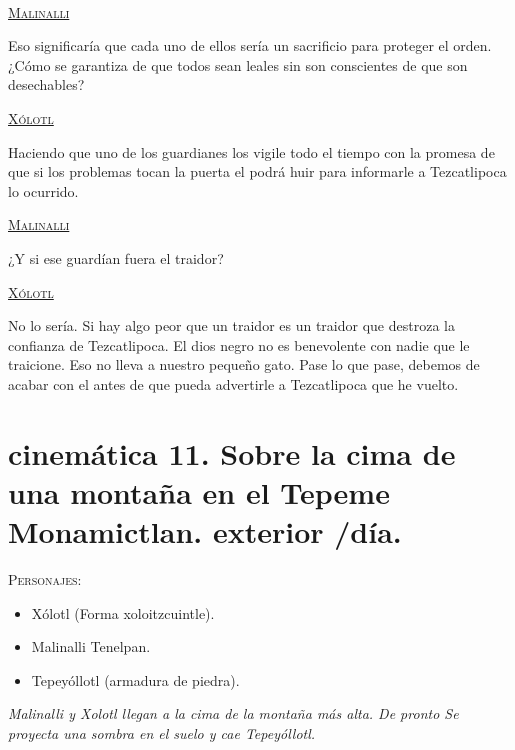 \documentclass[11pt,letterpaper]{article}
\begin{document}
\begin{center}
\\
\par
\textsc{\underline{Malinalli}}
\\
\par
Eso significaría que cada uno de ellos sería un sacrificio para proteger el orden. ¿Cómo se garantiza de que todos sean leales sin son conscientes de que son desechables?
\\
\par
\textsc{\underline{Xólotl}}
\\
\par
Haciendo que uno de los guardianes los vigile todo el tiempo con la promesa de que si los problemas tocan la puerta el podrá huir para informarle a Tezcatlipoca lo ocurrido. 
\\
\par
\textsc{\underline{Malinalli}}
\\
\par
¿Y si ese guardían fuera el traidor?
\\
\par
\textsc{\underline{Xólotl}}
\\
\par
No lo sería. Si hay algo peor que un traidor es un traidor que destroza la confianza de Tezcatlipoca. El dios negro no es benevolente con nadie que le traicione. Eso no lleva a nuestro pequeño gato. Pase lo que pase, debemos de acabar con el antes de que pueda advertirle a Tezcatlipoca que he vuelto.
\end{center}

\section{cinemática 11. Sobre la cima de una montaña en el Tepeme Monamictlan. exterior /día.}
 \textsc{Personajes}:
 \begin{itemize}
 	\item Xólotl (Forma xoloitzcuintle).
	\item Malinalli Tenelpan.
	\item Tepeyóllotl (armadura de piedra).
 \end{itemize}
 
 \textit{Malinalli y Xolotl llegan a la cima de la montaña más alta. De pronto Se proyecta una sombra en el suelo y cae Tepeyóllotl.}
 
\end{document}
